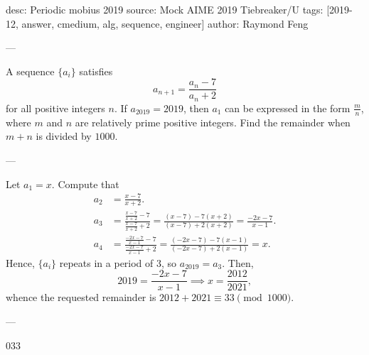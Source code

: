 desc: Periodic mobius 2019
source: Mock AIME 2019 Tiebreaker/U
tags: [2019-12, answer, cmedium, alg, sequence, engineer]
author: Raymond Feng

---

A sequence $\{a_i\}$ satisfies \[a_{n+1}=\frac{a_n-7}{a_n+2}\]
for all positive integers $n$. If $a_{2019}=2019$, then $a_1$ can be expressed in the form $\tfrac mn$, where $m$ and $n$ are relatively prime positive integers. Find the remainder when $m+n$ is divided by $1000$.

---

Let $a_1=x$. Compute that
\begin{align*}
    a_2&=\frac{x-7}{x+2}.\\
    a_3&=\frac{\frac{x-7}{x+2}-7}{\frac{x-7}{x+2}+2}=\frac{(x-7)-7(x+2)}{(x-7)+2(x+2)}=\frac{-2x-7}{x-1}.\\
    a_4&=\frac{\frac{-2x-7}{x-1}-7}{\frac{-2x-7}{x-1}+2}=\frac{(-2x-7)-7(x-1)}{(-2x-7)+2(x-1)}=x.
\end{align*}
Hence, $\{a_i\}$ repeats in a period of $3$, so $a_{2019}=a_3$. Then, \[2019=\frac{-2x-7}{x-1}\implies x=\frac{2012}{2021},\]
whence the requested remainder is $2012+2021\equiv 33\pmod{1000}$.

---

033
